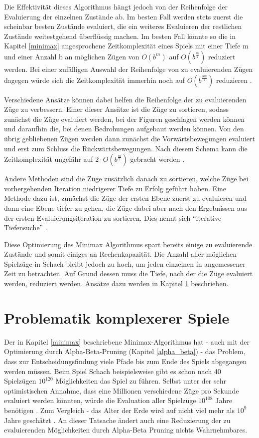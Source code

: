 Die Effektivität dieses Algorithmus hängt jedoch von der Reihenfolge der Evaluierung der einzelnen Zustände ab. Im besten Fall werden stets zuerst die scheinbar besten Zustände evaluiert, die ein weiteres Evaluieren der restlichen Zustände weitestgehend überflüssig machen. Im besten Fall könnte so die in Kapitel \ref{minimax} angesprochene Zeitkomplexität eines Spiels mit einer Tiefe m und einer Anzahl b an möglichen Zügen von $O(b^m)$ auf $O(b^\frac{m}{2})$ reduziert werden. Bei einer zufälligen Auswahl der Reihenfolge von zu evaluierenden Zügen dagegen würde sich die Zeitkomplexität immerhin noch auf $O(b^\frac{3m}{4})$ reduzieren  \cite{Russell2010}.

Verschiedene Ansätze können dabei helfen die Reihenfolge der zu evaluierenden Züge zu verbessern. Einer dieser Ansätze ist die Züge zu sortieren, sodass zunächst die Züge evaluiert werden, bei der Figuren geschlagen werden können und daraufhin die, bei denen Bedrohungen aufgebaut werden können. Von den übrig gebliebenen Zügen werden dann zunächst die Vorwärtsbewegungen evaluiert und erst zum Schluss die Rückwärtsbewegungen. Nach diesem Schema kann die Zeitkomplexität ungefähr auf $2 \cdot O(b^\frac{m}{2})$ gebracht werden \cite{Russell2010}.

Andere Methoden sind die Züge zusätzlich danach zu sortieren, welche Züge bei vorhergehenden Iteration niedrigerer Tiefe zu Erfolg geführt haben. Eine Methode dazu ist, zunächst die Züge der ersten Ebene zuerst zu evaluieren und dann eine Ebene tiefer zu gehen, die Züge dabei aber nach den Ergebnissen aus der ersten Evaluierungsiteration zu sortieren. Dies nennt sich ``iterative Tiefensuche'' \cite{Russell2010}.

Diese Optimierung des Minimax Algorithmus spart bereits einige zu evaluierende Zustände und somit einiges an Rechenkapazität. Die Anzahl aller möglichen Spielzüge in Schach bleibt jedoch zu hoch, um jeden einzelnen in angemessener Zeit zu betrachten. Auf Grund dessen muss die Tiefe, nach der die Züge evaluiert werden, reduziert werden. Ansätze dazu werden in Kapitel \ref{depth_limit} beschrieben.

\section{Problematik komplexerer Spiele}\label{depth_limit}

Der in Kapitel \ref{minimax} beschriebene Minimax-Algorithmus hat - auch mit der Optimierung durch Alpha-Beta-Pruning (Kapitel \ref{alpha_beta}) - das Problem, dass zur Entscheidungsfindung viele Pfade bis zum Ende des Spiels abgegangen werden müssen. Beim Spiel Schach beispielsweise gibt es schon nach 40 Spielzügen $10^{120}$ Möglichkeiten das Spiel zu führen. Selbst unter der sehr optimistischen Annahme, dass eine Millionen verschiedene Züge pro Sekunde evaluiert werden könnten, würde die Evaluation aller Spielzüge $10^{108}$ Jahre benötigen \cite{Bernstein1958}. Zum Vergleich - das Alter der Erde wird auf nicht viel mehr als $10^{9}$ Jahre geschätzt \cite{Braterman}. An dieser Tatsache ändert auch eine Reduzierung der zu evaluierenden Möglichkeiten durch Alpha-Beta Pruning nichts Wahrnehmbares.

